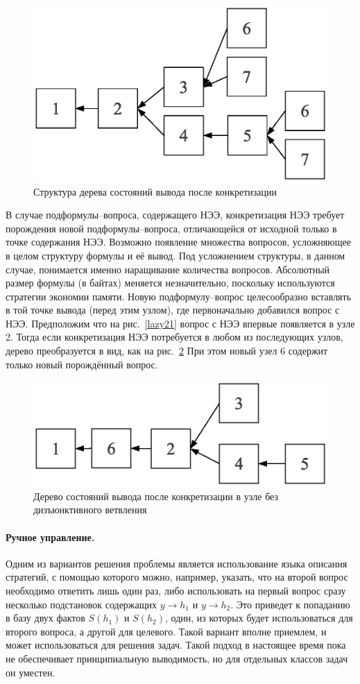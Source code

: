 \begin{figure}[h]
	\centering
	\includegraphics[width=0.5\linewidth]{pics/Lazy22.eps}
	\caption{Структура дерева состояний вывода после конкретизации}
	\label{lazy22}
\end{figure}

В случае подформулы--вопроса, содержащего НЭЭ, конкретизация НЭЭ требует порождения новой подформулы--вопроса, отличающейся от исходной только в точке содержания НЭЭ. Возможно появление множества вопросов, усложняющее в целом структуру формулы и её вывод. Под усложнением структуры, в данном случае, понимается именно наращивание количества вопросов. Абсолютный размер формулы (в байтах) меняется незначительно, поскольку используются стратегии экономии памяти. Новую подформулу--вопрос целесообразно вставлять в той точке вывода (перед этим узлом), где первоначально добавился вопрос с НЭЭ. Предположим что на рис.~\ref{lazy21} вопрос с НЭЭ впервые появляется в узле 2. Тогда если конкретизация НЭЭ потребуется в любом из последующих узлов, дерево преобразуется в вид, как на рис.~\ref{lazy23} При этом новый узел 6 содержит только новый порождённый вопрос.
\begin{figure}[h]
	\centering
	\includegraphics[width=0.5\linewidth]{pics/Lazy23.eps}
	\caption{Дерево состояний вывода после конкретизации в узле без дизъюнктивного ветвления}
	\label{lazy23}
\end{figure}

\paragraph{Ручное управление.}
Одним из вариантов решения проблемы является использование языка описания стратегий, с помощью которого можно, например, указать, что на второй вопрос необходимо ответить лишь один раз, либо использовать на первый вопрос сразу несколько подстановок содержащих $y\rightarrow h_1$ и $y\rightarrow h_2$. Это приведет к попаданию в базу двух фактов $S(h_1)$ и $S(h_2)$, один, из которых будет использоваться для второго вопроса, а другой для целевого. Такой вариант вполне приемлем, и может использоваться для решения задач. Такой подход в настоящее время пока не обеспечивает принципиальную выводимость, но для отдельных классов задач он уместен.

